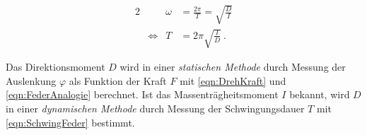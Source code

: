 \begin{alignat}{2}
    &       & \omega    & = \frac{2\pi}{T} = \sqrt{\frac{D}{I}}  \\
    & \iff  & T         & = 2\pi \sqrt{\frac{I}{D}}\:.
    \label{eqn:SchwingFeder}
\end{alignat}

Das Direktionsmoment $D$ wird in einer \textit{statischen Methode} durch Messung der Auslenkung $\varphi$ als Funktion der Kraft $F$ mit \eqref{eqn:DrehKraft} und \eqref{eqn:FederAnalogie}
berechnet. Ist das Massenträgheitsmoment $I$ bekannt, wird $D$ in einer \textit{dynamischen Methode} durch Messung der Schwingungsdauer $T$ mit \eqref{eqn:SchwingFeder}
bestimmt. 